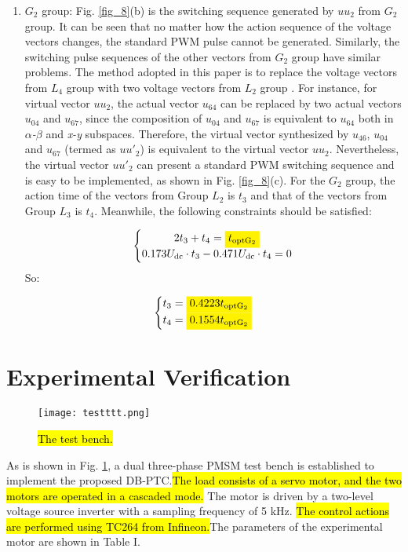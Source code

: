 \documentclass[sn-basic]{sn-jnl}
\newcommand{\mathcolorbox}[2]{\colorbox{#1}{$\displaystyle #2$}}
\theoremstyle{thmstyleone}%
\theoremstyle{thmstyletwo}%
\theoremstyle{thmstylethree}%
\theoremstyle{thmstyleone}%
\begin{document}
\begin{enumerate}
    \item ${{G}_2}$ group: Fig. \ref{fig_8}(b) is the switching sequence generated by ${{uu}_2}$ from ${{G}_2}$ group. It can be seen that no matter how the action sequence of the voltage vectors changes, the standard PWM pulse cannot be generated. Similarly, the switching pulse sequences of the other vectors from ${{G}_2}$ group have similar problems. The method adopted in this paper is to replace the voltage vectors from ${L_4}$ group with two voltage vectors from ${L}_{2}$ group \cite{8486708}. For instance, for virtual vector ${{uu}_2}$, the actual vector ${u}_{64}$ can be replaced by two actual vectors ${u}_{04}$ and ${u}_{67}$, since the composition of ${u}_{04}$ and ${u}_{67}$ is equivalent to ${u}_{64}$ both in \textit{$\alpha$-$\beta$} and \textit{x-y} subspaces. Therefore, the virtual vector synthesized by ${u}_{46}$, ${u}_{04}$ and ${u}_{67}$ (termed as ${{uu'}_2}$) is equivalent to the virtual vector ${{uu}_2}$. Nevertheless, the virtual vector ${{uu'}_2}$ can present a standard PWM switching sequence and is easy to be implemented, as shown in Fig. \ref{fig_8}(c). For the ${{G}_2}$ group, the action time of the vectors from Group ${L}_{2}$ is ${t}_3$ and that of the vectors from Group ${L}_3$ is ${t}_4$.  Meanwhile, the following constraints should be satisfied:
    

\begin{equation}
\left\{ \begin{matrix}
{2t_{3} + t_{4} = \mathcolorbox{yellow}{{t}_{\mathrm{optG_2}}}} \\
{0.173U_{\text{dc}} \cdot t _{3} - 0.471U_{\text{dc}} \cdot t_{4} = 0} \\
\end{matrix} \right.
\end{equation}
 So:
\end{enumerate}


\begin{equation}
\left\{ \begin{matrix}
{t_{3} = \mathcolorbox{yellow}{0.4223{t}_{\mathrm{optG_2}}}} \\
{t_{4} = \mathcolorbox{yellow}{0.1554{t}_{\mathrm{optG_2}}}}\\
\end{matrix} \right.
\end{equation}




\section{Experimental Verification}\label{sec5}
\begin{figure}[h]
\centering
\texttt{[image: testttt.png]}
\caption{\hl{The test bench.  } }
\label{fig_9}
\end{figure}
As is shown in Fig. {\ref{fig_9}}, a dual three-phase PMSM test bench is established to implement the proposed DB-PTC.\hl{The load consists of a servo motor, and the two motors are operated in a cascaded mode.}  The motor is driven by a two-level voltage source inverter with a sampling frequency of 5 kHz. \hl{The control actions are performed using TC264 from Infineon.}The parameters of the experimental motor are shown in Table I.
\end{document}
